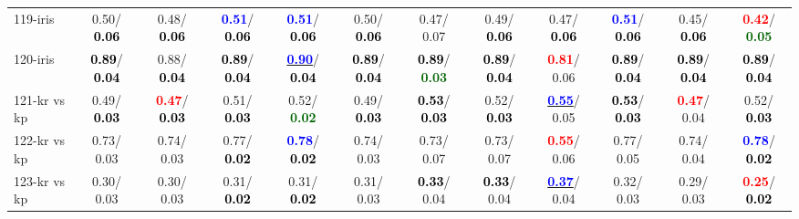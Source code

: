 \begin{table}[h]
\begin{center}
{\begin{tabular}{lc|c|c|c|c|c|c|c|c|c|c}
119-iris &   0.50/\textcolor{black}{\textbf{  0.06}} &   0.48/\textcolor{black}{\textbf{  0.06}} & \textcolor{blue}{\textbf{  0.51}}/\textcolor{black}{\textbf{  0.06}} & \textcolor{blue}{\textbf{  0.51}}/\textcolor{black}{\textbf{  0.06}} &   0.50/\textcolor{black}{\textbf{  0.06}} &   0.47/  0.07 &   0.49/\textcolor{black}{\textbf{  0.06}} &   0.47/\textcolor{black}{\textbf{  0.06}} & \textcolor{blue}{\textbf{  0.51}}/\textcolor{black}{\textbf{  0.06}} &   0.45/\textcolor{black}{\textbf{  0.06}} & \textcolor{red}{\textbf{  0.42}}/\textcolor{darkgreen}{\textbf{  0.05}} \\
120-iris & \textcolor{black}{\textbf{  0.89}}/\textcolor{black}{\textbf{  0.04}} &   0.88/\textcolor{black}{\textbf{  0.04}} & \textcolor{black}{\textbf{  0.89}}/\textcolor{black}{\textbf{  0.04}} & \underline{\textcolor{blue}{\textbf{  0.90}}}/\textcolor{black}{\textbf{  0.04}} & \textcolor{black}{\textbf{  0.89}}/\textcolor{black}{\textbf{  0.04}} & \textcolor{black}{\textbf{  0.89}}/\textcolor{darkgreen}{\textbf{  0.03}} & \textcolor{black}{\textbf{  0.89}}/\textcolor{black}{\textbf{  0.04}} & \textcolor{red}{\textbf{  0.81}}/  0.06 & \textcolor{black}{\textbf{  0.89}}/\textcolor{black}{\textbf{  0.04}} & \textcolor{black}{\textbf{  0.89}}/\textcolor{black}{\textbf{  0.04}} & \textcolor{black}{\textbf{  0.89}}/\textcolor{black}{\textbf{  0.04}} \\
121-kr vs kp &   0.49/\textcolor{black}{\textbf{  0.03}} & \textcolor{red}{\textbf{  0.47}}/\textcolor{black}{\textbf{  0.03}} &   0.51/\textcolor{black}{\textbf{  0.03}} &   0.52/\textcolor{darkgreen}{\textbf{  0.02}} &   0.49/\textcolor{black}{\textbf{  0.03}} & \textcolor{black}{\textbf{  0.53}}/\textcolor{black}{\textbf{  0.03}} &   0.52/\textcolor{black}{\textbf{  0.03}} & \underline{\textcolor{blue}{\textbf{  0.55}}}/  0.05 & \textcolor{black}{\textbf{  0.53}}/\textcolor{black}{\textbf{  0.03}} & \textcolor{red}{\textbf{  0.47}}/  0.04 &   0.52/\textcolor{black}{\textbf{  0.03}} \\
122-kr vs kp &   0.73/  0.03 &   0.74/  0.03 &   0.77/\textcolor{black}{\textbf{  0.02}} & \textcolor{blue}{\textbf{  0.78}}/\textcolor{black}{\textbf{  0.02}} &   0.74/  0.03 &   0.73/  0.07 &   0.73/  0.07 & \textcolor{red}{\textbf{  0.55}}/  0.06 &   0.77/  0.05 &   0.74/  0.04 & \textcolor{blue}{\textbf{  0.78}}/\textcolor{black}{\textbf{  0.02}} \\
123-kr vs kp &   0.30/  0.03 &   0.30/  0.03 &   0.31/\textcolor{black}{\textbf{  0.02}} &   0.31/\textcolor{black}{\textbf{  0.02}} &   0.31/  0.03 & \textcolor{black}{\textbf{  0.33}}/  0.04 & \textcolor{black}{\textbf{  0.33}}/  0.04 & \underline{\textcolor{blue}{\textbf{  0.37}}}/  0.04 &   0.32/  0.03 &   0.29/  0.03 & \textcolor{red}{\textbf{  0.25}}/\textcolor{black}{\textbf{  0.02}} \\

\end{tabular}}
\end{center}
\end{table}
